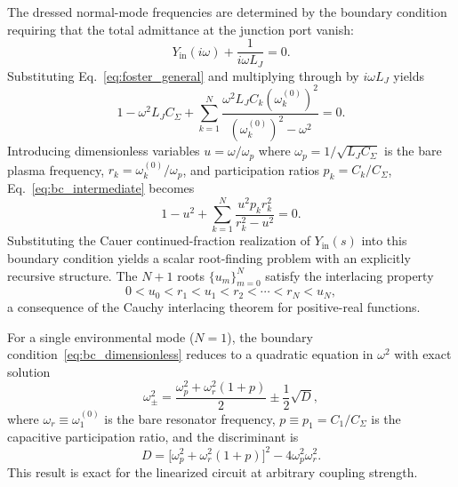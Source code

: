 \documentclass[reprint, floatfix, superscriptaddress, amsmath, amssymb, longbibliography]{revtex4-2}
\begin{document}
The dressed normal-mode frequencies are determined by the boundary condition requiring that the total admittance at the junction port vanish:
\begin{equation}
Y_{\mathrm{in}}(i\omega) + \frac{1}{i\omega L_J} = 0.
\label{eq:boundary_condition_foster}
\end{equation}
Substituting Eq.~\eqref{eq:foster_general} and multiplying through by $i\omega L_J$ yields
\begin{equation}
1 - \omega^2 L_J C_\Sigma + \sum_{k=1}^{N} \frac{\omega^2 L_J C_k (\omega_k^{(0)})^2}{(\omega_k^{(0)})^2 - \omega^2} = 0.
\label{eq:bc_intermediate}
\end{equation}
Introducing dimensionless variables $u = \omega/\omega_p$ where $\omega_p = 1/\sqrt{L_J C_\Sigma}$ is the bare plasma frequency, $r_k = \omega_k^{(0)}/\omega_p$, and participation ratios $p_k = C_k/C_\Sigma$, Eq.~\eqref{eq:bc_intermediate} becomes
\begin{equation}
1 - u^2 + \sum_{k=1}^{N} \frac{u^2 p_k r_k^2}{r_k^2 - u^2} = 0.
\label{eq:bc_dimensionless}
\end{equation}
Substituting the Cauer continued-fraction realization of $Y_{\mathrm{in}}(s)$ into this boundary condition yields a scalar root-finding problem with an explicitly recursive structure. The $N+1$ roots $\{u_m\}_{m=0}^{N}$ satisfy the interlacing property
\begin{equation}
0 < u_0 < r_1 < u_1 < r_2 < \cdots < r_N < u_N,
\label{eq:interlacing}
\end{equation}
a consequence of the Cauchy interlacing theorem for positive-real functions.

For a single environmental mode ($N=1$), the boundary condition~\eqref{eq:bc_dimensionless} reduces to a quadratic equation in $\omega^2$ with exact solution
\begin{equation}
\omega_\pm^2 = \frac{\omega_p^2 + \omega_r^2(1+p)}{2} \pm \frac{1}{2}\sqrt{D},
\label{eq:exact_frequencies}
\end{equation}
where $\omega_r \equiv \omega_1^{(0)}$ is the bare resonator frequency, $p \equiv p_1 = C_1/C_\Sigma$ is the capacitive participation ratio, and the discriminant is
\begin{equation}
D = \bigl[\omega_p^2 + \omega_r^2(1+p)\bigr]^2 - 4\omega_p^2\omega_r^2.
\label{eq:discriminant}
\end{equation}
This result is exact for the linearized circuit at arbitrary coupling strength.
\end{document}
